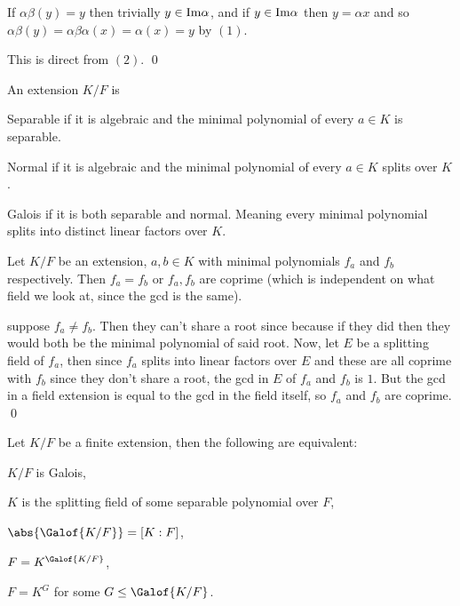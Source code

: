     \item If $\alpha\beta(y)=y$ then trivially $y\in{\rm Im}\alpha$, and if $y\in{\rm Im}\alpha$ then $y=\alpha x$ and so $\alpha\beta(y)=\alpha\beta\alpha(x)=\alpha(x)=y$ by $(1)$.

    \item This is direct from $(2)$.
    \qed
\eenum

\bdefn

    An extension $K/F$ is
    \benum
        \item {\emphcolor Separable} if it is algebraic and the minimal polynomial of every $a\in K$ is separable.
        \item {\emphcolor Normal} if it is algebraic and the minimal polynomial of every $a\in K$ splits over $K$.
        \item {\emphcolor Galois} if it is both separable and normal.
        Meaning every minimal polynomial splits into distinct linear factors over $K$.
    \eenum

\edefn

\blemm

    Let $K/F$ be an extension, $a,b\in K$ with minimal polynomials $f_a$ and $f_b$ respectively.
    Then $f_a=f_b$ or $f_a,f_b$ are coprime (which is independent on what field we look at, since the gcd is the same).

\elemm

\Proof suppose $f_a\neq f_b$.
Then they can't share a root since because if they did then they would both be the minimal polynomial of said root.
Now, let $E$ be a splitting field of $f_a$, then since $f_a$ splits into linear factors over $E$ and these are all coprime with $f_b$ since they don't share a root, the gcd in $E$ of $f_a$ and $f_b$ is
$1$.
But the gcd in a field extension is equal to the gcd in the field itself, so $f_a$ and $f_b$ are coprime.
\qed

\bthrm[name=galoisextension]

    Let $K/F$ be a finite extension, then the following are equivalent:
    \benum
        \item $K/F$ is Galois,
        \item $K$ is the splitting field of some separable polynomial over $F$,
        \item $\abs{\Galof{K/F}}=[K:F]$,
        \item $F=K^{\Galof{K/F}}$,
        \item $F=K^G$ for some $G\leq\Galof{K/F}$.
    \eenum

\ethrm

